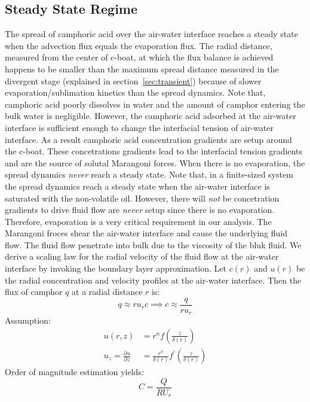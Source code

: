 \documentclass[aps, twocolumn, floatfix, superscriptaddress]{revtex4}
\newcommand{\pdc}[3][]{\frac{\partial^{#1} #2}{\partial #3^{#1}}} %
\begin{document}
\subsection{Steady State Regime}
\label{sec:steady}
The spread of camphoric acid over the air-water interface reaches a steady state when the advection flux equals the evaporation flux. The radial distance, measured from the center of c-boat, at which the flux balance is achieved happens to be smaller than the maximum spread distance measured in the divergent stage (explained in section~\ref{sec:transient}) because of slower evaporation/sublimation kinetics than the spread dynamics. Note that, camphoric acid poorly dissolves in water and the amount of camphor entering the bulk water is negligible. However, the camphoric acid adsorbed at the air-water interface is sufficient enough to change the interfacial tension of air-water interface. As a result camphoric acid concentration gradients are setup around the c-boat. These concetrations gradients lead to the interfacial tension gradients and are the source of solutal Marangoni forces. When there is no evaporation, the spread dynamics \emph{never} reach a steady state. Note that, in a finite-sized system the spread dynamics reach a steady state when the air-water interface is saturated with the non-volatile oil. However, there will \emph{not} be concetration gradients to drive fluid flow are \emph{never} setup since there is no evaporation. Therefore, evaporation is a very critical requirement in our analysis. The Marangoni froces shear the air-water interface and cause the underlying fluid flow. The fluid flow penetrate into bulk due to the viscosity of the bluk fluid. We derive a scaling law for the radial velocity of the fluid flow at the air-water interface by invoking the boundary layer approximation. Let $c(r)$ and $u(r)$ be the radial concentration and velocity profiles at the air-water interface. Then the flux of camphor $q$ at a radial distance $r$ is: 
\begin{equation}
q \approx r u_{r} c \implies c \approx \frac{q}{ru_{r}} 
\end{equation}
Assumption:
\begin{align}
u(r, z) &= r^{n} f\left( \frac{z}{\delta(r)} \right) \\
u_{z} = \pdc{u}{z} &= \frac{r^{n}}{\delta(r)} f^{\prime}\left(\frac{z}{\delta(r)} \right)
\end{align}
Order of magnitude estimation yields:
\begin{equation}
C = \frac{Q}{RU_{r}}
\end{equation}
\end{document}
